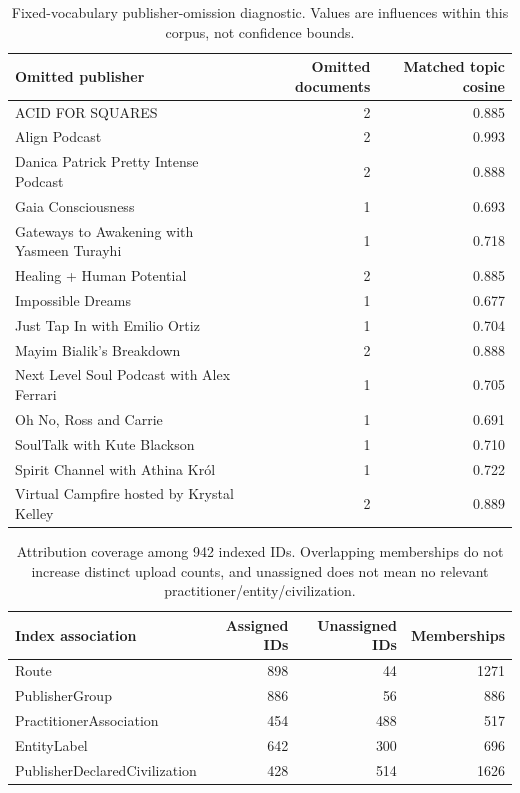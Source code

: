\begin{table}[t]
\centering\small
\begin{tabular}{p{}rr}
\toprule
Omitted publisher & Omitted documents & Matched topic cosine\\
\midrule
ACID FOR SQUARES & 2 & 0.885\\
Align Podcast & 2 & 0.993\\
Danica Patrick Pretty Intense Podcast & 2 & 0.888\\
Gaia Consciousness & 1 & 0.693\\
Gateways to Awakening with Yasmeen Turayhi & 1 & 0.718\\
Healing + Human Potential & 2 & 0.885\\
Impossible Dreams & 1 & 0.677\\
Just Tap In with Emilio Ortiz & 1 & 0.704\\
Mayim Bialik's Breakdown & 2 & 0.888\\
Next Level Soul Podcast with Alex Ferrari & 1 & 0.705\\
Oh No, Ross and Carrie & 1 & 0.691\\
SoulTalk with Kute Blackson & 1 & 0.710\\
Spirit Channel with Athina Król & 1 & 0.722\\
Virtual Campfire hosted by Krystal Kelley & 2 & 0.889\\
\bottomrule
\end{tabular}
\caption{Fixed-vocabulary publisher-omission diagnostic. Values are influences within this corpus, not confidence bounds.}
\end{table}
\begin{table}[t]
\centering\small
\begin{tabular}{p{}rrr}
\toprule
Index association & Assigned IDs & Unassigned IDs & Memberships\\
\midrule
Route & 898 & 44 & 1271\\
PublisherGroup & 886 & 56 & 886\\
PractitionerAssociation & 454 & 488 & 517\\
EntityLabel & 642 & 300 & 696\\
PublisherDeclaredCivilization & 428 & 514 & 1626\\
\bottomrule
\end{tabular}
\caption{Attribution coverage among 942 indexed IDs. Overlapping memberships do not increase distinct upload counts, and unassigned does not mean no relevant practitioner/entity/civilization.}
\end{table}
